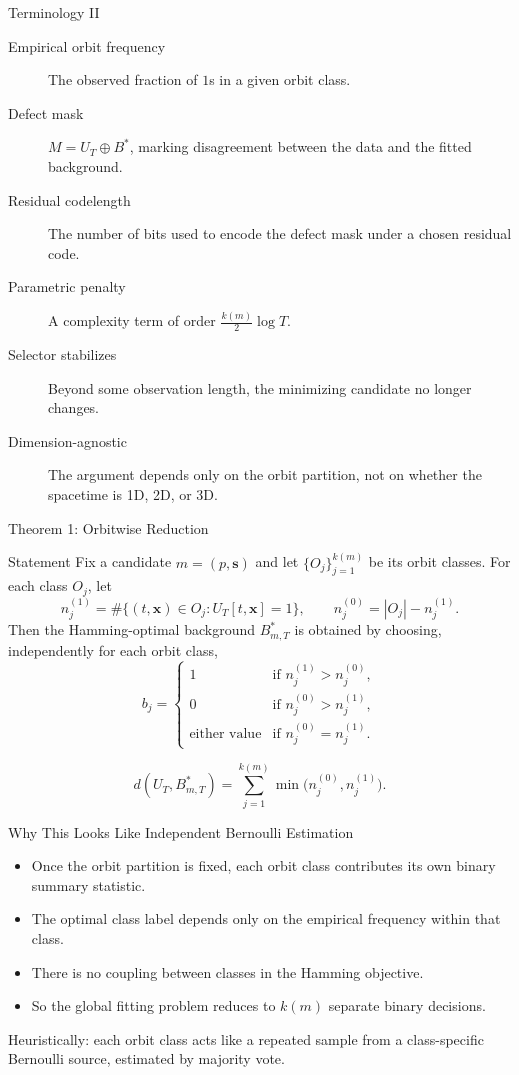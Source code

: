 \documentclass[aspectratio=169]{beamer}
\begin{document}
\begin{frame}{Terminology II}
  \begin{description}
    \item[Empirical orbit frequency] The observed fraction of $1$s in a given orbit class.
    \item[Defect mask] $M = U_T \oplus B^*$, marking disagreement between the data and the fitted background.
    \item[Residual codelength] The number of bits used to encode the defect mask under a chosen residual code.
    \item[Parametric penalty] A complexity term of order $\frac{k(m)}{2}\log T$.
    \item[Selector stabilizes] Beyond some observation length, the minimizing candidate no longer changes.
    \item[Dimension-agnostic] The argument depends only on the orbit partition, not on whether the spacetime is 1D, 2D, or 3D.
  \end{description}
\end{frame}

\begin{frame}{Theorem 1: Orbitwise Reduction}
  \begin{block}{Statement}
    Fix a candidate $m=(p,\mathbf{s})$ and let $\{O_j\}_{j=1}^{k(m)}$ be its orbit classes. For each class $O_j$, let
    \[
      n_j^{(1)} = \#\{(t,\mathbf{x}) \in O_j : U_T[t,\mathbf{x}] = 1\},
      \qquad
      n_j^{(0)} = |O_j| - n_j^{(1)}.
    \]
    Then the Hamming-optimal background $B^*_{m,T}$ is obtained by choosing, independently for each orbit class,
    \[
      b_j =
      \begin{cases}
        1 & \text{if } n_j^{(1)} > n_j^{(0)}, \\
        0 & \text{if } n_j^{(0)} > n_j^{(1)}, \\
        \text{either value} & \text{if } n_j^{(0)} = n_j^{(1)}.
      \end{cases}
    \]
  \end{block}

  \[
    d(U_T,B^*_{m,T}) = \sum_{j=1}^{k(m)} \min\bigl(n_j^{(0)}, n_j^{(1)}\bigr).
  \]
\end{frame}

\begin{frame}{Why This Looks Like Independent Bernoulli Estimation}
  \begin{itemize}
    \item Once the orbit partition is fixed, each orbit class contributes its own binary summary statistic.
    \item The optimal class label depends only on the empirical frequency within that class.
    \item There is no coupling between classes in the Hamming objective.
    \item So the global fitting problem reduces to $k(m)$ separate binary decisions.
  \end{itemize}

  \vspace{0.5em}
  Heuristically: each orbit class acts like a repeated sample from a class-specific Bernoulli source, estimated by majority vote.
\end{frame}
\end{document}
